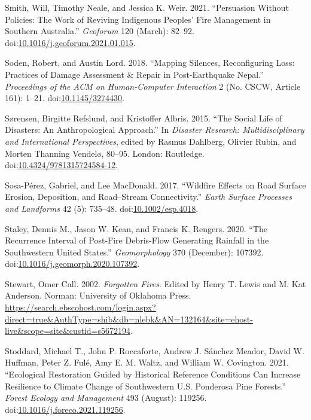 \documentclass[
]{article}
\newlength{\cslhangindent}
\newenvironment{CSLReferences}[2] %
 {\begin{list}{}{%
  \setlength{\itemindent}{0pt}
  \setlength{\leftmargin}{0pt}
  \setlength{\parsep}{0pt}
  \ifodd #1
   \setlength{\leftmargin}{\cslhangindent}
   \setlength{\itemindent}{-1\cslhangindent}
  \fi
  \setlength{\itemsep}{#2\baselineskip}}}
 {\end{list}}
\begin{document}
\begin{CSLReferences}{1}{0}
Smith, Will, Timothy Neale, and Jessica K. Weir. 2021. {``Persuasion Without Policies: {The} Work of Reviving {Indigenous} Peoples' Fire Management in Southern {Australia}.''} \emph{Geoforum} 120 (March): 82--92. doi:\href{https://doi.org/10.1016/j.geoforum.2021.01.015}{10.1016/j.geoforum.2021.01.015}.

Soden, Robert, and Austin Lord. 2018. {``Mapping {Silences}, {Reconfiguring Loss}: {Practices} of {Damage Assessment} \& {Repair} in {Post-Earthquake Nepal}.''} \emph{Proceedings of the ACM on Human-Computer Interaction} 2 (No. CSCW, Article 161): 1--21. doi:\href{https://doi.org/10.1145/3274430}{10.1145/3274430}.

Sørensen, Birgitte Refslund, and Kristoffer Albris. 2015. {``The Social Life of Disasters: An Anthropological Approach.''} In \emph{Disaster {Research}: {Multidisciplinary} and {International Perspectives}}, edited by Rasmus Dahlberg, Olivier Rubin, and Morten Thanning Vendelø, 80--95. London: Routledge. doi:\href{https://doi.org/10.4324/9781315724584-12}{10.4324/9781315724584-12}.

Sosa-Pérez, Gabriel, and Lee MacDonald. 2017. {``Wildfire Effects on Road Surface Erosion, Deposition, and Road--Stream Connectivity.''} \emph{Earth Surface Processes and Landforms} 42 (5): 735--48. doi:\href{https://doi.org/10.1002/esp.4018}{10.1002/esp.4018}.

Staley, Dennis M., Jason W. Kean, and Francis K. Rengers. 2020. {``The Recurrence Interval of Post-Fire Debris-Flow Generating Rainfall in the Southwestern {United States}.''} \emph{Geomorphology} 370 (December): 107392. doi:\href{https://doi.org/10.1016/j.geomorph.2020.107392}{10.1016/j.geomorph.2020.107392}.

Stewart, Omer Call. 2002. \emph{Forgotten {Fires}}. Edited by Henry T. Lewis and M. Kat Anderson. Norman: University of Oklahoma Press. \url{https://search.ebscohost.com/login.aspx?direct=true&AuthType=shib&db=nlebk&AN=132164&site=ehost-live&scope=site&custid=s5672194}.

Stoddard, Michael T., John P. Roccaforte, Andrew J. Sánchez Meador, David W. Huffman, Peter Z. Fulé, Amy E. M. Waltz, and William W. Covington. 2021. {``Ecological Restoration Guided by Historical Reference Conditions Can Increase Resilience to Climate Change of Southwestern {U}.{S}. {Ponderosa} Pine Forests.''} \emph{Forest Ecology and Management} 493 (August): 119256. doi:\href{https://doi.org/10.1016/j.foreco.2021.119256}{10.1016/j.foreco.2021.119256}.


\end{CSLReferences}
\end{document}
